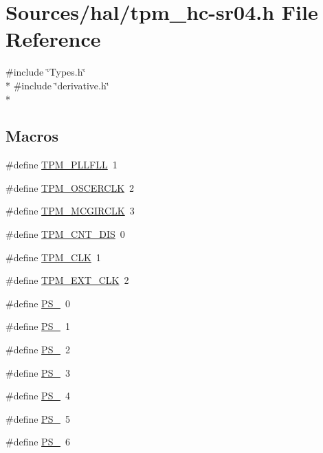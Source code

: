 \hypertarget{tpm__hc-sr04_8h}{}\section{Sources/hal/tpm\+\_\+hc-\/sr04.h File Reference}
\label{tpm__hc-sr04_8h}
{\ttfamily \#include \char`\"{}Types.\+h\char`\"{}}\\*
{\ttfamily \#include \char`\"{}derivative.\+h\char`\"{}}\\*
\subsection*{Macros}
\begin{DoxyCompactItemize}
\item 
\#define \hyperlink{tpm__hc-sr04_8h_acc81e53bf64f3c7dcbc353d52cbd1819}{T\+P\+M\+\_\+\+P\+L\+L\+F\+LL}~1
\item 
\#define \hyperlink{tpm__hc-sr04_8h_a798afd820bae19e624af56c8601f55ef}{T\+P\+M\+\_\+\+O\+S\+C\+E\+R\+C\+LK}~2
\item 
\#define \hyperlink{tpm__hc-sr04_8h_af5f5b10c96ffe915043071aaabdef972}{T\+P\+M\+\_\+\+M\+C\+G\+I\+R\+C\+LK}~3
\item 
\#define \hyperlink{tpm__hc-sr04_8h_a9350cc2857aad08da7bc2fc653f21ba3}{T\+P\+M\+\_\+\+C\+N\+T\+\_\+\+D\+IS}~0
\item 
\#define \hyperlink{tpm__hc-sr04_8h_ad4acb6bf77fa55af095bb3242009150e}{T\+P\+M\+\_\+\+C\+LK}~1
\item 
\#define \hyperlink{tpm__hc-sr04_8h_a204d587d289b357d2457eadaf9ba7809}{T\+P\+M\+\_\+\+E\+X\+T\+\_\+\+C\+LK}~2
\item 
\#define \hyperlink{tpm__hc-sr04_8h_af8c1cc647ec92ffbf73384c2b1d3b1d1}{P\+S\+\_}~0
\item 
\#define \hyperlink{tpm__hc-sr04_8h_a9c0f90cb04742b102df8cf778e167d73}{P\+S\+\_}~1
\item 
\#define \hyperlink{tpm__hc-sr04_8h_ab8927f9c31e0bc98758bbf90c7e852b3}{P\+S\+\_}~2
\item 
\#define \hyperlink{tpm__hc-sr04_8h_a83eab3432f78f8041d140048f9bdc159}{P\+S\+\_}~3
\item 
\#define \hyperlink{tpm__hc-sr04_8h_aaf52372f79355a3c831511b2fea947ee}{P\+S\+\_}~4
\item 
\#define \hyperlink{tpm__hc-sr04_8h_a58d367baac81af0dd63111e2faab6c8e}{P\+S\+\_}~5
\item 
\#define \hyperlink{tpm__hc-sr04_8h_ada495be9420499b4fb148b98ac01731e}{P\+S\+\_}~6

\end{DoxyCompactItemize}
